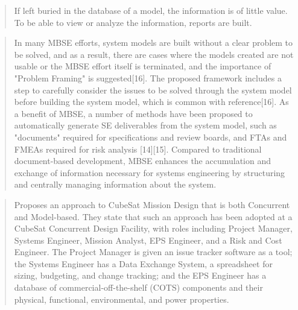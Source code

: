 \begin{quote}
If left buried in the database of a model, the information is of little value. To be able to view or analyze the
information, reports are built.
\cite{review-1438}
\end{quote}

\begin{quote}
In many MBSE efforts, system models are built without a clear problem to be solved, and as a result, there are
cases where the models created are not usable or the MBSE effort itself is terminated, and the importance of "Problem
Framing" is suggested[16]. The proposed framework includes a step to carefully consider the issues to be solved
through the system model before building the system model, which is common with reference[16].
As a benefit of MBSE, a number of methods have been proposed to automatically generate SE deliverables from
the system model, such as "documents" required for specifications and review boards, and FTAs and FMEAs required
for risk analysis [14][15]. Compared to traditional document-based development, MBSE enhances the accumulation
and exchange of information necessary for systems engineering by structuring and centrally managing information
about the system.
\cite{handpicked-0004}
\end{quote}

\begin{quote}
Proposes an approach to CubeSat Mission Design that is both Concurrent and Model-based.
They state that such an approach has been adopted at a CubeSat Concurrent Design Facility, with roles including Project Manager, Systems Engineer, Mission Analyst, EPS Engineer, and a Risk and Cost Engineer.
The Project Manager is given an issue tracker software as a tool; the Systems Engineer has a Data Exchange System, a spreadsheet for sizing, budgeting, and change tracking; and the EPS Engineer has a database of commercial-off-the-shelf (COTS) components and their physical, functional, environmental, and power properties.
\cite{review-0529}
\end{quote}